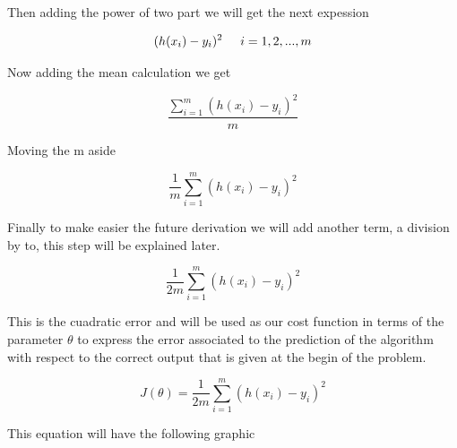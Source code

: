 \documentclass[12pt,journal]{IEEEtran}
\begin{document}
    Then adding the power of two part we will get the next expession

    \begin{equation}
        (h(x_i) - y_i)^2 \hspace{0.5cm} i=1, 2, ..., m
    \end{equation}

    Now adding the mean calculation we get

    \begin{equation}
        \frac{\sum_{i=1}^{m} (h(x_i) - y_i)^2}{m}
    \end{equation}

    Moving the m aside

    \begin{equation}
       \frac{1}{m} \sum_{i=1}^{m} ( h(x_i) - y_i )^2
    \end{equation}

    Finally to make easier the future derivation we will add another term, a
    division by to, this step will be explained later.

    \begin{equation}
       \frac{1}{2m} \sum_{i=1}^{m} ( h(x_i) - y_i )^2
    \end{equation}

    This is the cuadratic error and will be used as our cost function in terms
    of the parameter $\theta$ to express the error associated to the prediction
    of the algorithm with respect to the correct output that is given at the
    begin of the problem.

    \begin{equation}
       J(\theta) = \frac{1}{2m} \sum_{i=1}^{m} ( h(x_i) - y_i )^2
    \end{equation}

    This equation will have the following graphic

    \begin{figure}[h!]
    \end{figure}
\end{document}
